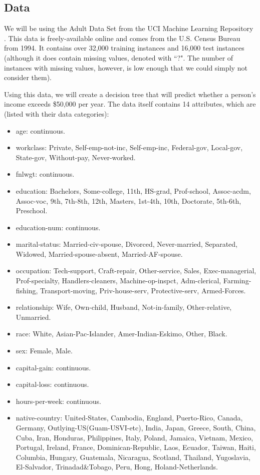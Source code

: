 \documentclass{article}
\begin{document}
\subsection{Data}
We will be using the Adult Data Set from the UCI Machine Learning Repository \cite{bache-lichman}. This data is freely-available online and comes from the U.S. Census Bureau from 1994. It contains over 32,000 training instances and 16,000 test instances (although it does contain missing values, denoted with ``?". The number of instances with missing values, however, is low enough that we could simply not consider them). 

Using this data, we will create a decision tree that will predict whether a person's income exceeds \$50,000 per year. The data itself contains 14 attributes, which are (listed with their data categories):

\begin{itemize}
\item age: continuous. 
\item workclass: Private, Self-emp-not-inc, Self-emp-inc, Federal-gov, Local-gov, State-gov, Without-pay, Never-worked. 
\item fnlwgt: continuous. 
\item education: Bachelors, Some-college, 11th, HS-grad, Prof-school, Assoc-acdm, Assoc-voc, 9th, 7th-8th, 12th, Masters, 1st-4th, 10th, Doctorate, 5th-6th, Preschool. 
\item education-num: continuous. 
\item marital-status: Married-civ-spouse, Divorced, Never-married, Separated, Widowed, Married-spouse-absent, Married-AF-spouse. 
\item occupation: Tech-support, Craft-repair, Other-service, Sales, Exec-managerial, Prof-specialty, Handlers-cleaners, Machine-op-inspct, Adm-clerical, Farming-fishing, Transport-moving, Priv-house-serv, Protective-serv, Armed-Forces. 
\item relationship: Wife, Own-child, Husband, Not-in-family, Other-relative, Unmarried. 
\item race: White, Asian-Pac-Islander, Amer-Indian-Eskimo, Other, Black. 
\item sex: Female, Male. 
\item capital-gain: continuous. 
\item capital-loss: continuous. 
\item hours-per-week: continuous. 
\item native-country: United-States, Cambodia, England, Puerto-Rico, Canada, Germany, Outlying-US(Guam-USVI-etc), India, Japan, Greece, South, China, Cuba, Iran, Honduras, Philippines, Italy, Poland, Jamaica, Vietnam, Mexico, Portugal, Ireland, France, Dominican-Republic, Laos, Ecuador, Taiwan, Haiti, Columbia, Hungary, Guatemala, Nicaragua, Scotland, Thailand, Yugoslavia, El-Salvador, Trinadad\&Tobago, Peru, Hong, Holand-Netherlands.
\end{itemize}
\end{document}
